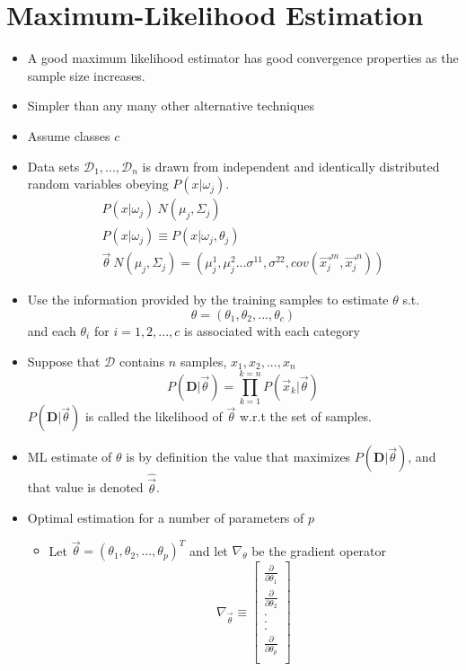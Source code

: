 \documentclass[11pt]{article}
\begin{document}
\section{Maximum-Likelihood Estimation}
\begin{itemize}
		\item A good maximum likelihood estimator has good convergence properties as the sample size increases.
		\item Simpler than any many other alternative techniques
		\item Assume classes $c$
 		\item Data sets $\mathcal{D}_1 , ..., \mathcal{D}_n$ is drawn from independent and identically distributed random variables obeying $P(x | \omega_j)$.
		\begin{eqnarray}
		P(x | \omega_j) ~ N (\mu_j, \Sigma_j) \\
		P(x | \omega_j) \equiv P( x | \omega_j , \theta_j) \\
		\vec{\theta} ~ N(\mu _j , \Sigma_j ) = ( \mu_j ^1, \mu_j ^2 ... \sigma^{11}, \sigma^{22}, cov (\vec{x_j}^m , \vec{x_j}^n))
		\end{eqnarray}
		\item Use the information provided by the training samples to estimate $\theta$ s.t.
		\[
		\theta = ( \theta_1, \theta_2, ..., \theta_c) 
		\] 
		and each $\theta_i$ for $i = 1,2,...,c $ is associated with each category
		\item Suppose that $\mathcal{D}$ contains $n$ samples, $x_1, x_2, ..., x_n$
		\[
		P(\mathbf{D} | \vec{\theta}) = \prod _{k=1} ^{k=n} P(\vec{x}_k | \vec{\theta} ) %
		\]
		$P(\mathbf{D} | \vec{\theta})$ is called the likelihood of $\vec{\theta}$ w.r.t the set of samples. 
		\item ML estimate of $\theta$ is by definition the value that maximizes $P(\mathbf{D} | \vec{\theta})$, and that value is denoted $\hat{\vec{\theta}}$.  
		\item Optimal estimation for a number of parameters of $p$
		\begin{itemize}
			\item Let $\vec{\theta} = ( \theta_1 , \theta_2, ..., \theta_p) ^T$ and let $\nabla _{\theta}$ be the gradient operator
			\begin{equation}
			\nabla _{\vec{\theta}} \equiv 
			\left[
			\begin{array}{c}
			\frac{\partial}{\partial \theta_1} \\
			\frac{\partial}{\partial \theta_2} \\
			. \\ . \\ . \\
			\frac{\partial}{\partial \theta_p} \\
			\end{array}
			\right]
			\end{equation}
			

\end{itemize}
\end{itemize}
\end{document}
